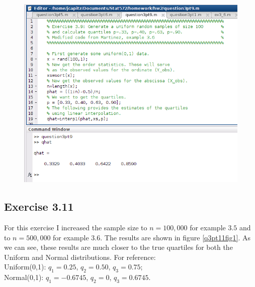 \documentclass[12pt,a4paper]{article}
\begin{document}
\begin{figure}[ht!]
\begin{center}
\includegraphics[scale=.60]{q3pt9_code.png}
\caption{}
\label{q3pt9fig1}
\end{center}
\end{figure}
\FloatBarrier

\subsection*{Exercise 3.11}

For this exercise I increased the sample size to $n=100,000$ for example $3.5$ and to $n=500,000$ for example 3.6. The results are shown in figure \ref{q3pt11fig1}. As we can see, these results are much closer to the true quartiles for both the Uniform and Normal distributions. For reference:\\

Uniform(0,1): $q_1=0.25$, $q_2=0.50$, $q_3=0.75$;\\

Normal(0,1): $q_1=-0.6745$, $q_2=0$, $q_3=0.6745$.\\
\end{document}
